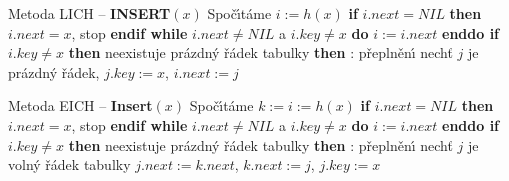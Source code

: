 \documentclass[a4paper,12pt]{article}
\begin{document}
\flushpar Metoda LICH -- {\bf INSERT$(x)$}\newline 
Spo\v c\'\i t\'ame $i:=h(x)$\newline 
{\bf if} $i.next=NIL$ {\bf then} $i.next=x$, stop {\bf endif\newline 
while} $i.next\ne NIL$ a $i.key\ne x$ {\bf do} $i:=i.next$ {\bf enddo\newline 
if} $i.key\ne x$ {\bf then}\newline 
\phantom{---}{\bf if} neexistuje pr\'azdn\'y \v r\'adek tabulky {\bf then}\newline 
\phantom{------}{\bf V\'ystup}: p\v repln\v en\'\i\newline 
\phantom{---}{\bf else}\newline 
\phantom{------}nech\v t $j$ je pr\'azdn\'y \v r\'adek, $j
.key:=x$, $i.next:=j$\newline 
\phantom{---}{\bf endif\newline 
endif}
\bigskip

\flushpar Metoda EICH -- {\bf Insert$(x)$}\newline 
Spo\v c\'\i t\'ame $k:=i:=h(x)$\newline 
{\bf if} $i.next=NIL$ {\bf then} $i.next=x$, stop {\bf endif\newline 
while} $i.next\ne NIL$ a $i.key\ne x$ {\bf do} $i:=i.next$ {\bf enddo\newline 
if} $i.key\ne x$ {\bf then}\newline 
\phantom{---}{\bf if} neexistuje pr\'azdn\'y \v r\'adek tabulky {\bf then}\newline 
\phantom{------}{\bf V\'ystup}: p\v repln\v en\'\i\newline 
\phantom{---}{\bf else}\newline 
\phantom{------}nech\v t $j$ je voln\'y \v r\'adek tabulky\newline 
\phantom{------}$j.next:=k.next$, $k.next:=j$, $j.key:=x$\newline 
\phantom{---}{\bf endif\newline 
endif}
\bigskip
\end{document}
